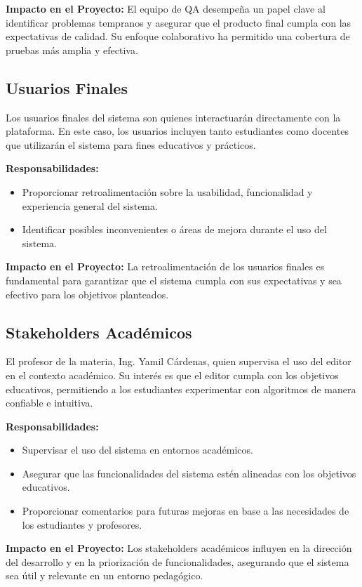 \documentclass[stu, 12pt, letterpaper, donotrepeattitle, floatsintext, natbib]{apa7}
\begin{document}
\textbf{Impacto en el Proyecto:}  
El equipo de QA desempeña un papel clave al identificar problemas tempranos y asegurar que el producto final cumpla con las expectativas de calidad. Su enfoque colaborativo ha permitido una cobertura de pruebas más amplia y efectiva.

\subsection{Usuarios Finales} 
Los usuarios finales del sistema son quienes interactuarán directamente con la plataforma. En este caso, los usuarios incluyen tanto estudiantes como docentes que utilizarán el sistema para fines educativos y prácticos.

\textbf{Responsabilidades:}
\begin{itemize}
    \item Proporcionar retroalimentación sobre la usabilidad, funcionalidad y experiencia general del sistema.
    \item Identificar posibles inconvenientes o áreas de mejora durante el uso del sistema.
\end{itemize}

\textbf{Impacto en el Proyecto:}  
La retroalimentación de los usuarios finales es fundamental para garantizar que el sistema cumpla con sus expectativas y sea efectivo para los objetivos planteados.


\subsection{Stakeholders Académicos} 
El profesor de la materia, Ing. Yamil Cárdenas, quien supervisa el uso del editor en el contexto académico. Su interés es que el editor cumpla con los objetivos educativos, permitiendo a los estudiantes experimentar con algoritmos de manera confiable e intuitiva.

\textbf{Responsabilidades:}
\begin{itemize}
    \item Supervisar el uso del sistema en entornos académicos.
    \item Asegurar que las funcionalidades del sistema estén alineadas con los objetivos educativos.
    \item Proporcionar comentarios para futuras mejoras en base a las necesidades de los estudiantes y profesores.
\end{itemize}

\textbf{Impacto en el Proyecto:}  
Los stakeholders académicos influyen en la dirección del desarrollo y en la priorización de funcionalidades, asegurando que el sistema sea útil y relevante en un entorno pedagógico.
\end{document}
